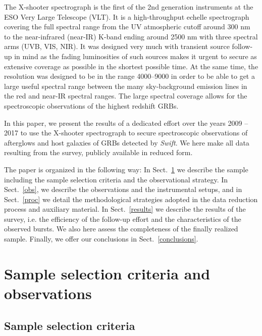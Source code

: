 \documentclass{aa}    %
\begin{document}
The X-shooter spectrograph \citep{Vernet2011} is the first of the 2nd generation
instruments at the ESO Very Large Telescope (VLT). It is a high-throughput
echelle spectrograph covering the full spectral range from the UV atmospheric
cutoff around 300 nm to the near-infrared (near-IR) K-band ending around 2500 nm
with three spectral arms (UVB, VIS, NIR). It was designed very much with
transient source follow-up in mind as the fading luminosities of such sources
makes it urgent to secure as extensive coverage as possible in the shortest
possible time. At the same time, the resolution was designed to be in the range
4000--9000 in order to be able to get a large useful spectral range between the
many sky-background emission lines in the red and near-IR spectral ranges. The
large spectral coverage allows for the spectroscopic observations of the
highest redshift GRBs.

In this paper, we present the results of a dedicated effort over the years 2009
-- 2017 to use the X-shooter spectrograph to secure spectroscopic observations
of afterglows and host galaxies of GRBs detected by {\it Swift}. We here make
all data resulting from the survey, publicly available in reduced form.

The paper is organized in the following way: In Sect.~\ref{sample} we describe
the sample including the sample selection criteria and the observational
strategy. In Sect.~\ref{obs}, we describe the observations and the instrumental
setups, and in Sect.~\ref{proc} we detail the methodological strategies adopted
in the data reduction process and auxiliary material. In Sect.~\ref{results} we
describe the results of the survey, i.e. the efficiency of the follow-up effort
and the characteristics of the observed bursts. We also here assess the
completeness of the finally realized sample. Finally, we offer our conclusions
in Sect.~\ref{conclusions}.


\section{Sample selection criteria and observations}\label{sample}



\subsection{Sample selection criteria} \label{samplecrit}
\end{document}

